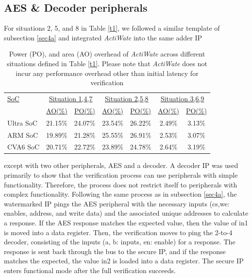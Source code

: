 \documentclass[onecolumn]{IEEEtran}
\begin{document}
\subsection{AES \& Decoder peripherals}
\label{sec4b}
For situations 2, 5, and 8 in Table \ref{t1}, we followed a similar template
of subsection \ref{sec4a} and integrated \textit{ActiWate} into the same adder IP
\begin{table}[h!]
	\centering
	\caption{Power (PO), and area (AO) overhead of \textit{ActiWate} across different
		situations defined in Table \ref{t1}. Please note that \textit{ActiWate} does not incur any
		performance overhead other than initial latency for verification}
	\label{t2}
	\begin{tabular}{lcc cc cc}
		\hline
		\underline{SoC} & \multicolumn{2}{c}{\underline{Situation 1,4,7}} & \multicolumn{2}{c}{\underline{Situation 2,5,8}} & \multicolumn{2}{c}{\underline{Situation 3,6,9}} \\
		&\underline{AO(\%)} & \underline{PO(\%)} & \underline{AO(\%)} & \underline{PO(\%)} & \underline{AO(\%)} & \underline{PO(\%)} \\
		Ultra SoC & 21.15\% & 24.07\% & 23.54\% & 26.22\% & 2.49\% & 3.13\% \\
		ARM SoC   & 19.89\% & 21.28\% & 25.55\% & 26.91\% & 2.53\% & 3.07\% \\
		CVA6 SoC  & 20.71\% & 22.72\% & 23.89\% & 24.78\% & 2.64\% & 3.19\% \\ \hline
	\end{tabular}
	
\end{table}
except with two other peripherals, AES and a decoder. A decoder
IP was used primarily to show that the verification process can use
peripherals with simple functionality. Therefore, the process does not
restrict itself to peripherals with complex functionality. Following the
same process as in subsection \ref{sec4a}, the watermarked IP pings the
AES peripheral with the necessary inputs (cs,we: enables, address,
and write data) and the associated unique addresses to calculate a
response. If the AES response matches the expected value, then the
value of in1 is moved into a data register. Then, the verification moves
to ping the 2-to-4 decoder, consisting of the inputs (a, b: inputs, en:
enable) for a response. The response is sent back through the bus to
the secure IP, and if the response matches the expected, the value in2
is loaded into a data register. The secure IP enters functional mode
after the full verification succeeds.
\end{document}
